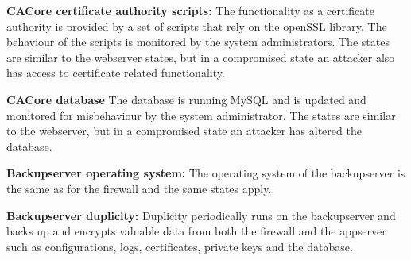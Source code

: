 \documentclass[english]{article}
\begin{document}
\begin{description}
		\item{\textbf{CACore certificate authority scripts:}} The functionality as a certificate authority is provided by a set of scripts that rely on the openSSL library. The behaviour of the scripts is monitored by the system administrators. The states are similar to the webserver states, but in a compromised state an attacker also has access to certificate related functionality.
		\item{\textbf{CACore database}} The database is running MySQL and is updated and monitored for misbehaviour by the system administrator. The states are similar to the webserver, but in a compromised state an attacker has altered the database.
		\item{\textbf{Backupserver operating system:}} The operating system of the backupserver is the same as for the firewall and the same states apply.
		\item{\textbf{Backupserver duplicity:}} Duplicity periodically runs on the backupserver and backs up and encrypts valuable data from both the firewall and the appserver such as configurations, logs, certificates, private keys and the database.
	\end{description}
\end{document}
